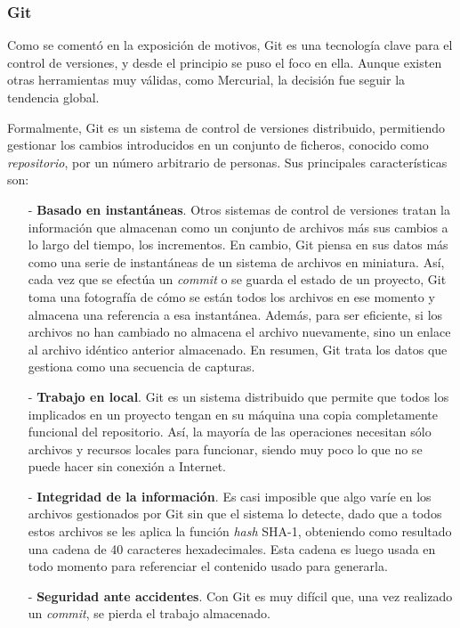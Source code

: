 \documentclass[a4paper]{article}
\begin{document}
    \subsubsection{Git}
    Como se comentó en la exposición de motivos, Git es una tecnología clave para el control de versiones, y desde el principio se puso el foco en ella. Aunque existen otras herramientas muy válidas, como Mercurial, la decisión fue seguir la tendencia global.
    
    Formalmente, Git es un sistema de control de versiones distribuido, permitiendo gestionar los cambios introducidos en un conjunto de ficheros, conocido como \emph{repositorio}, por un número arbitrario de personas. Sus principales características son:
    
    \begin{itemize}
    	\item[-] \textbf{Basado en instantáneas}. Otros sistemas de control de versiones tratan la información que almacenan como un conjunto de archivos más sus cambios a lo largo del tiempo, los incrementos. En cambio, Git piensa en sus datos más como una serie de instantáneas de un sistema de archivos en miniatura. Así, cada vez que se efectúa un \emph{commit} o se guarda el estado de un proyecto, Git toma una fotografía de cómo se están todos los archivos en ese momento y almacena una referencia a esa instantánea. Además, para ser eficiente, si los archivos no han cambiado no almacena el archivo nuevamente, sino un enlace al archivo idéntico anterior almacenado. En resumen, Git trata los datos que gestiona como una secuencia de capturas.
    	\item[-] \textbf{Trabajo en local}. Git es un sistema distribuido que permite que todos los implicados en un proyecto tengan en su máquina una copia completamente funcional del repositorio. Así, la mayoría de las operaciones necesitan sólo archivos y recursos locales para funcionar, siendo muy poco lo que no se puede hacer sin conexión a Internet. 
    	\item[-] \textbf{Integridad de la información}. Es casi imposible que algo varíe en los archivos gestionados por Git sin que el sistema lo detecte, dado que a todos estos archivos se les aplica la función \emph{hash} SHA-1, obteniendo como resultado una cadena de 40 caracteres hexadecimales. Esta cadena es luego usada en todo momento para referenciar el contenido usado para generarla.
    	\item[-] \textbf{Seguridad ante accidentes}. Con Git es muy difícil que, una vez realizado un \emph{commit}, se pierda el trabajo almacenado.
    \end{itemize}
    
\end{document}
